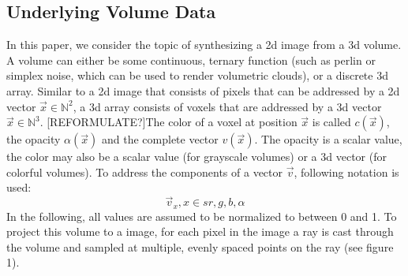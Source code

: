 {\subsection{Underlying Volume Data}
In this paper, we consider the topic of synthesizing a 2d image from a 3d volume.
A volume can either be some continuous, ternary function (such as perlin or simplex noise\cite{10.1145/325165.325247}, which can be used to render volumetric clouds\cite{haggstrom2018real}), or a discrete 3d array\cite{511}.
Similar to a 2d image that consists of pixels that can be addressed by a 2d vector $\vec{x} \in \mathbb{N}^2$, a 3d array consists of voxels that are addressed by a 3d vector $\vec{x} \in \mathbb{N}^3$. [REFORMULATE?]The color of a voxel at position $\vec{x}$ is called $c(\vec{x})$, the opacity $\alpha(\vec{x})$ and the complete vector $v(\vec{x})$. The opacity is a scalar value, the color may also be a scalar value (for grayscale volumes) or a 3d vector (for colorful volumes).
To address the components of a vector $\vec{v}$, following notation is used:
\begin{equation}
	\vec{v}_{x}, x \in s{r, g, b, \alpha}
\end{equation}
 In the following, all values are assumed to be normalized to between 0 and 1. To project this volume to a image, for each pixel in the image a ray is cast through the volume and sampled at multiple, evenly spaced points on the ray (see figure 1)\cite{10.1145/78964.78965}.


}
